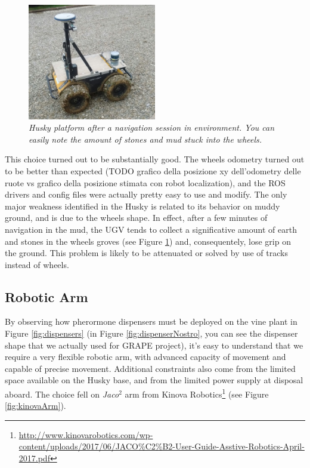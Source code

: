 \begin{figure}
	\centering
	\includegraphics[width=0.5\textwidth]{Images/grape_sw_hw_architecture/ruoteFangose.jpeg}
	\caption{\textit{Husky platform after a navigation session in environment. You can easily note the amount of stones and mud stuck into the wheels.}}
	\label{fig:ruoteFangose}
\end{figure}

This choice turned out to be substantially good. The wheels odometry turned out to be  better than expected (TODO grafico della posizione xy dell'odometry delle ruote vs grafico della posizione stimata con robot localization), and the \ac{ROS} drivers and config files were actually pretty easy to use and modify. The only major weakness identified in the Husky is related to its behavior on muddy ground, and is due to the wheels shape. In effect, after a few minutes of navigation in the mud, the \ac{UGV} tends to collect a significative amount of earth and stones in the wheels groves (see Figure \ref{fig:ruoteFangose}) and, consequentely, lose grip on the ground. This problem is likely to be attenuated or solved by use of tracks instead of wheels.

\subsection{Robotic Arm}
By observing how pherormone dispensers must be deployed on the vine plant in Figure \ref{fig:dispensers} (in Figure \ref{fig:dispenserNostro}, you can see the dispenser shape that we actually used for \ac{GRAPE} project), it's easy to understand that we require a very flexible robotic arm, with advanced capacity of movement and capable of precise movement. Additional constraints also come from the limited space available on the Husky base, and from the limited power supply at disposal aboard. The choice fell on \textit{Jaco$^2$} arm from Kinova Robotics\footnote{\url{http://www.kinovarobotics.com/wp-content/uploads/2017/06/JACO\%C2\%B2-User-Guide-Asstive-Robotics-April-2017.pdf}}
(see Figure \ref{fig:kinovaArm}).

